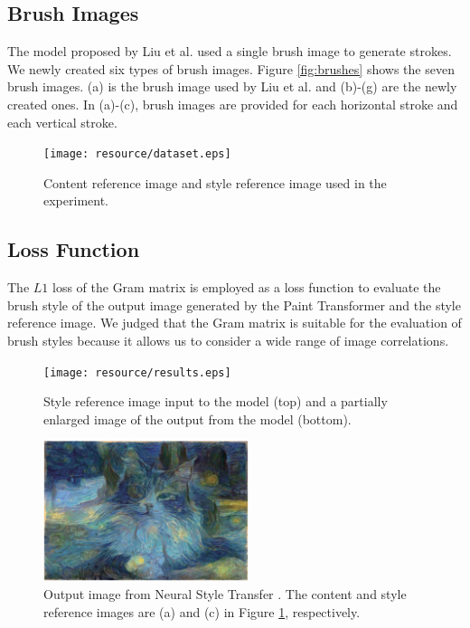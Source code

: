 \documentclass{mva_style}
\begin{document}
\subsection{Brush Images}
The model proposed by Liu et al. used a single brush image to generate strokes. 
We newly created six types of brush images. Figure \ref{fig:brushes} shows 
the seven brush images. (a) is the brush image used by Liu et al. and (b)-(g) 
are the newly created ones. In (a)-(c), brush images are provided for each 
horizontal stroke and each vertical stroke.

\begin{figure}[t]
  \centering
  \texttt{[image: resource/dataset.eps]}
  \caption{Content reference image and style reference image used in the experiment.}
  \label{fig:inputs}
\end{figure}

\subsection{Loss Function}
The $L1$ loss of the Gram matrix is employed as a loss function to evaluate 
the brush style of the output image generated by the Paint Transformer and 
the style reference image. We judged that the Gram matrix is suitable for 
the evaluation of brush styles because it allows us to consider a wide range 
of image correlations.

\begin{figure}[t]
  \centering
  \texttt{[image: resource/results.eps]}
  \caption{Style reference image input to the model (top) and a partially enlarged image of the output from the model (bottom).}
  \label{fig:result}
\end{figure}

\begin{figure}[t]
  \centering
  \includegraphics[width=60mm]{resource/cat-starry.eps}
  \caption{Output image from Neural Style Transfer \cite{ImageStyleTransfer}.
  The content and style reference images are (a) and (c) in Figure \ref{fig:inputs}, respectively.
  }
  \label{fig:cat-starry}
\end{figure}
\end{document}
